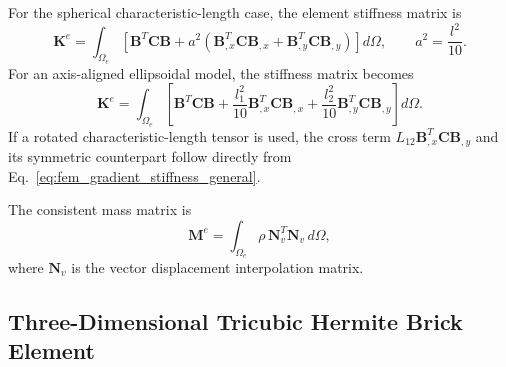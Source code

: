 \documentclass[final,3p,times,fleqn]{elsarticle}
\begin{document}
For the spherical characteristic-length case, the element stiffness matrix is
\begin{equation}
\label{eq:2d_bfs_stiffness_isotropic}
\mathbf{K}^{e}
=
\int_{\Omega_e}
\left[
\mathbf{B}^{T}\mathbf{C}\mathbf{B}
+
a^2
\left(
\mathbf{B}_{,x}^{T}\mathbf{C}\mathbf{B}_{,x}
+
\mathbf{B}_{,y}^{T}\mathbf{C}\mathbf{B}_{,y}
\right)
\right]d\Omega,
\qquad
a^2=\frac{l^2}{10}.
\end{equation}
For an axis-aligned ellipsoidal model, the stiffness matrix becomes
\begin{equation}
\label{eq:2d_bfs_stiffness_anisotropic}
\mathbf{K}^{e}
=
\int_{\Omega_e}
\left[
\mathbf{B}^{T}\mathbf{C}\mathbf{B}
+
\frac{l_1^2}{10}
\mathbf{B}_{,x}^{T}\mathbf{C}\mathbf{B}_{,x}
+
\frac{l_2^2}{10}
\mathbf{B}_{,y}^{T}\mathbf{C}\mathbf{B}_{,y}
\right]d\Omega .
\end{equation}
If a rotated characteristic-length tensor is used, the cross term
$L_{12}\mathbf{B}_{,x}^{T}\mathbf{C}\mathbf{B}_{,y}$ and its symmetric
counterpart follow directly from Eq.~\eqref{eq:fem_gradient_stiffness_general}.

The consistent mass matrix is
\begin{equation}
\label{eq:2d_bfs_mass}
\mathbf{M}^{e}
=
\int_{\Omega_e}
\rho\,\mathbf{N}_v^T\mathbf{N}_v\,d\Omega ,
\end{equation}
where $\mathbf{N}_v$ is the vector displacement interpolation matrix.

\subsection{Three-Dimensional Tricubic Hermite Brick Element}
\label{subsec:three_dimensional_hermite_element}
\end{document}
